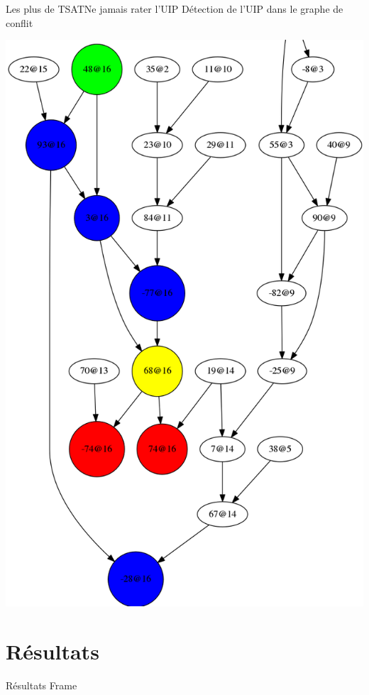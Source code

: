 \documentclass{beamer}
\begin{document}
        \begin{frame}{Les plus de TSAT}{Ne jamais rater l'UIP}
            Détection de l'UIP dans le graphe de conflit 
            \begin{center}
                \includegraphics[scale=0.15]{graphe.png}
            \end{center}
        \end{frame}

    \section{Résultats}
        \begin{frame}{Résultats}{}
            Frame 
        \end{frame}       
\end{document}
